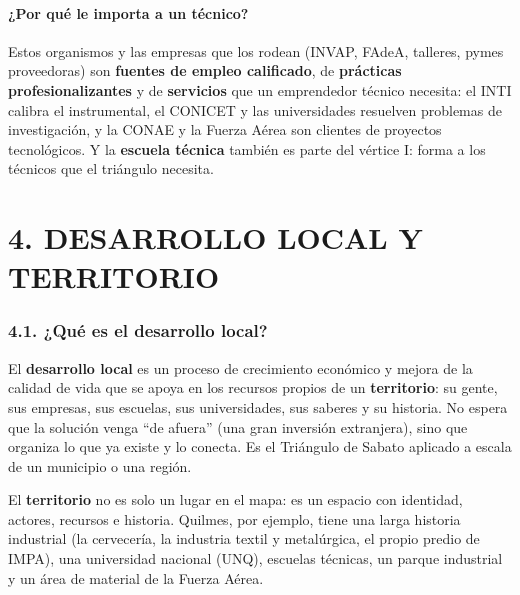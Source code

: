 \paragraph*{¿Por qué le importa a un técnico?}
Estos organismos y las empresas que los rodean (INVAP, FAdeA, talleres, pymes proveedoras)
son \textbf{fuentes de empleo calificado}, de \textbf{prácticas profesionalizantes} y de
\textbf{servicios} que un emprendedor técnico necesita: el INTI calibra el instrumental, el
CONICET y las universidades resuelven problemas de investigación, y la CONAE y la Fuerza Aérea
son clientes de proyectos tecnológicos. Y la \textbf{escuela técnica} también es parte del
vértice I: forma a los técnicos que el triángulo necesita.

\section*{4. DESARROLLO LOCAL Y TERRITORIO}

\subsubsection*{4.1. ¿Qué es el desarrollo local?}
El \textbf{desarrollo local} es un proceso de crecimiento económico y mejora de la calidad de
vida que se apoya en los recursos propios de un \textbf{territorio}: su gente, sus empresas,
sus escuelas, sus universidades, sus saberes y su historia. No espera que la solución venga
``de afuera'' (una gran inversión extranjera), sino que organiza lo que ya existe y lo conecta.
Es el Triángulo de Sabato aplicado a escala de un municipio o una región.

El \textbf{territorio} no es solo un lugar en el mapa: es un espacio con identidad, actores,
recursos e historia. Quilmes, por ejemplo, tiene una larga historia industrial (la cervecería,
la industria textil y metalúrgica, el propio predio de IMPA), una universidad nacional (UNQ),
escuelas técnicas, un parque industrial y un área de material de la Fuerza Aérea.

